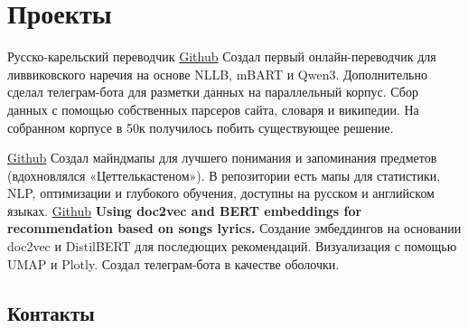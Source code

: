 \documentclass[12pt,a4paper,sans]{moderncv}
\begin{document}





\section{Проекты}
\cvline
{Русско-карельский переводчик}
{\href{https://github.com/breadfan/kielven_project}{Github}\newline{}
	Создал первый онлайн-переводчик для ливвиковского наречия на основе NLLB, mBART и Qwen3. Дополнительно сделал телеграм-бота для разметки данных на параллельный корпус. Сбор данных с помощью собственных парсеров сайта, словаря и википедии. На собранном корпусе в 50к получилось побить существующее решение.
	}

  {\href{https://github.com/breadfan/mindmaps-for-everything}{Github}\newline{}
  	Создал майндмапы для лучшего понимания и запоминания предметов (вдохновлялся «Цеттелькастеном»). В репозитории есть мапы для статистики, NLP, оптимизации и глубокого обучения, доступны на русском и английском языках.
  }
  {\href{https://github.com/breadfan/lyrics-based-songs-recommender}{Github}\newline{}
  	\textbf{Using doc2vec and BERT embeddings for recommendation based on songs lyrics.}
  	\newline{}
  	Создание эмбеддингов на основании doc2vec и DistilBERT для последющих рекомендаций. Визуализация с помощью UMAP и Plotly. Создал телеграм-бота в качестве оболочки.}
 

  
  	
  






 \subsection{Контакты}
    
\end{document}
